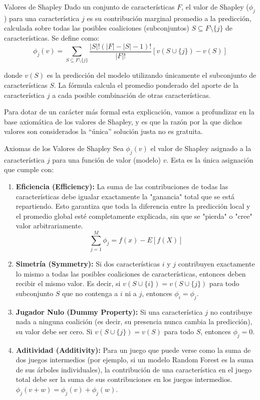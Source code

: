 \begin{definicion}{Valores de Shapley} 
	Dado un conjunto de características $F$, el valor de Shapley ($\phi_j$) para una característica $j$ es su contribución marginal promedio a la predicción, calculada sobre todas las posibles coaliciones (subconjuntos) $S \subseteq F \setminus \{j\}$ de características. Se define como:
	\[
	\phi_j(v) = \sum_{S \subseteq F \setminus \{j\}} \frac{|S|!(|F| - |S| - 1)!}{|F|!} [v(S \cup \{j\}) - v(S)]
	\]
	
	donde $v(S)$ es la predicción del modelo utilizando únicamente el subconjunto de características $S$. La fórmula calcula el promedio ponderado del aporte de la característica $j$ a cada posible combinación de otras características.
\end{definicion}

Para dotar de un carácter más formal esta explicación, vamos a profundizar en la base axiomática de los valores de Shapley, y es que la razón por la que dichos valores son considerados la ``única'' solución justa no es gratuita.   

\begin{teorema}{Axiomas de los Valores de Shapley}
		Sea $\phi_j(v)$ el valor de Shapley asignado a la característica $j$ para una función de valor (modelo) $v$. Esta es la única asignación que cumple con:\begin{enumerate}
		\item \textbf{Eficiencia (Efficiency):} La suma de las contribuciones de todas las características debe igualar exactamente la "ganancia" total que se está repartiendo. Esto garantiza que toda la diferencia entre la predicción local y el promedio global esté completamente explicada, sin que se "pierda" o "cree" valor arbitrariamente.
		\[ \sum_{j=1}^{M} \phi_j = f(x) - E[f(X)] \]
		
		\item \textbf{Simetría (Symmetry):} Si dos características $i$ y $j$ contribuyen exactamente lo mismo a todas las posibles coaliciones de características, entonces deben recibir el mismo valor. Es decir, si $v(S \cup \{i\}) = v(S \cup \{j\})$ para todo subconjunto $S$ que no contenga a $i$ ni a $j$, entonces $\phi_i = \phi_j$.
		
		\item \textbf{Jugador Nulo (Dummy Property):} Si una característica $j$ no contribuye nada a ninguna coalición (es decir, su presencia nunca cambia la predicción), su valor debe ser cero. Si $v(S \cup \{j\}) = v(S)$ para todo $S$, entonces $\phi_j = 0$.
		
		\item \textbf{Aditividad (Additivity):} Para un juego que puede verse como la suma de dos juegos intermedios (por ejemplo, si un modelo Random Forest es la suma de sus árboles individuales), la contribución de una característica en el juego total debe ser la suma de sus contribuciones en los juegos intermedios. $\phi_j(v + w) = \phi_j(v) + \phi_j(w)$.
	\end{enumerate}
\end{teorema}

